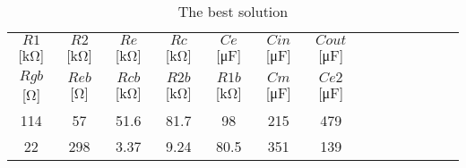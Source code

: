 \begin{table}[H]
\centering
\begin{tabular}{@{}cccccccccccccc@{}}
\toprule
    $R1$ [\si{\kilo\ohm}] & $R2$ [\si{\kilo\ohm}] & $Re$ [\si{\kilo\ohm}] & $Rc$ [\si{\kilo\ohm}] & $Ce$ [\si{\micro\farad}] & $Cin$ [\si{\micro\farad}] & $Cout$ [\si{\micro\farad}] \\
    $Rgb$ [\si{\ohm}] & $Reb$ [\si{\ohm}] & $Rcb$ [\si{\kilo\ohm}] & $R2b$ [\si{\kilo\ohm}] & $R1b$ [\si{\kilo\ohm}] & $Cm$ [\si{\micro\farad}] & $Ce2$ [\si{\micro\farad}] \\
    \midrule
    114 & 57  & 51.6 & 81.7 & 98   & 215 & 479 & \\
    22  & 298 & 3.37 & 9.24 & 80.5 & 351 & 139   \\
    \bottomrule
\end{tabular}
\caption{The best solution}
\label{best-solution-two-stage-tab}
\end{table}